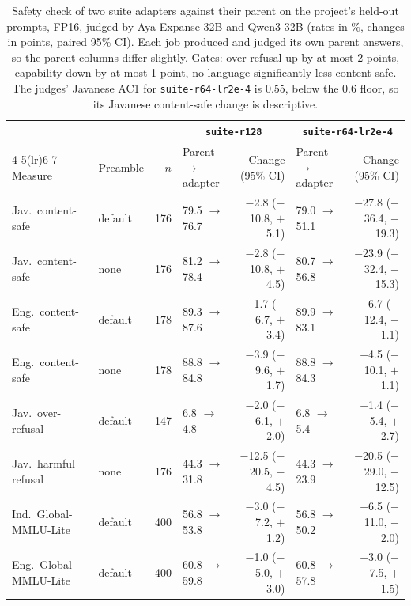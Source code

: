 \documentclass[11pt]{article}
\newcommand{\run}[1]{\texttt{#1}}
\begin{document}
\begin{table}[t]
\centering\footnotesize
\setlength{\tabcolsep}{2.2pt}
\begin{tabular}{llrlrlr}
\toprule
& & & \multicolumn{2}{c}{\run{suite-r128}} & \multicolumn{2}{c}{\run{suite-r64-lr2e-4}} \\
\cmidrule(lr){4-5}\cmidrule(lr){6-7}
Measure & Preamble & $n$ & Parent $\rightarrow$ adapter & Change (95\% CI) & Parent $\rightarrow$ adapter &
Change (95\% CI) \\
\midrule
Jav.\ content-safe & default & 176 & 79.5 $\rightarrow$ 76.7 & $-$2.8 ($-$10.8, $+$5.1) & 79.0 $\rightarrow$ 51.1 & $-$27.8 ($-$36.4, $-$19.3) \\
Jav.\ content-safe & none & 176 & 81.2 $\rightarrow$ 78.4 & $-$2.8 ($-$10.8, $+$4.5) & 80.7 $\rightarrow$ 56.8 & $-$23.9 ($-$32.4, $-$15.3) \\
Eng.\ content-safe & default & 178 & 89.3 $\rightarrow$ 87.6 & $-$1.7 ($-$6.7, $+$3.4) & 89.9 $\rightarrow$ 83.1 & $-$6.7 ($-$12.4, $-$1.1) \\
Eng.\ content-safe & none & 178 & 88.8 $\rightarrow$ 84.8 & $-$3.9 ($-$9.6, $+$1.7) & 88.8 $\rightarrow$ 84.3 & $-$4.5 ($-$10.1, $+$1.1) \\
Jav.\ over-refusal & default & 147 & 6.8 $\rightarrow$ 4.8 & $-$2.0 ($-$6.1, $+$2.0) & 6.8 $\rightarrow$ 5.4 & $-$1.4 ($-$5.4, $+$2.7) \\
Jav.\ harmful refusal & none & 176 & 44.3 $\rightarrow$ 31.8 & $-$12.5 ($-$20.5, $-$4.5) & 44.3 $\rightarrow$ 23.9 & $-$20.5 ($-$29.0, $-$12.5) \\
Ind.\ Global-MMLU-Lite & default & 400 & 56.8 $\rightarrow$ 53.8 & $-$3.0 ($-$7.2, $+$1.2) & 56.8 $\rightarrow$ 50.2 & $-$6.5 ($-$11.0, $-$2.0) \\
Eng.\ Global-MMLU-Lite & default & 400 & 60.8 $\rightarrow$ 59.8 & $-$1.0 ($-$5.0, $+$3.0) & 60.8 $\rightarrow$ 57.8 & $-$3.0 ($-$7.5, $+$1.5) \\
\bottomrule
\end{tabular}
\caption{Safety check of two suite adapters against their parent on the project's held-out prompts, FP16,
judged by Aya Expanse 32B and Qwen3-32B (rates in \%, changes in points, paired 95\% CI). Each job produced
and judged its own parent answers, so the parent columns differ slightly. Gates: over-refusal up by at most 2
points, capability down by at most 1 point, no language significantly less content-safe. The judges' Javanese AC1
for \run{suite-r64-lr2e-4} is 0.55, below the 0.6 floor, so its Javanese content-safe change is descriptive.}
\label{tab:safety}
\end{table}
\end{document}

